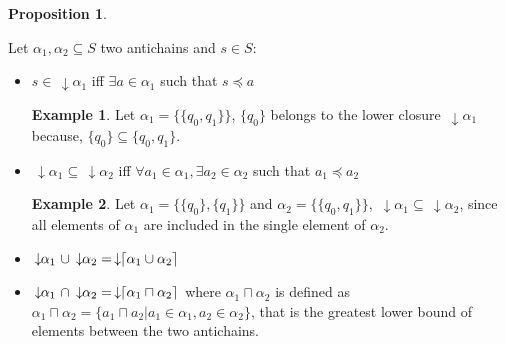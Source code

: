 \documentclass[11pt,a4paper]{article}
\DeclarePairedDelimiter{\ceil}{\lceil}{\rceil}
\newcommand{\darrow}{\, \downarrow \!\!}
\theoremstyle{definition}
\newtheorem{proposition}{Proposition}[subsection]
\newtheorem{example}{Example}[subsection]
\begin{document}
\begin{proposition}

\label{antichains_ops}

Let $\alpha_1, \alpha_2 \subseteq S$ two antichains and $s \in S$:

\begin{itemize}
    \item $s \in \darrow \alpha_1$
    iff $\exists a \in \alpha_1$ such that $s \preceq a$

    \begin{example}
        Let $\alpha_1 = \{\{q_0, q_1\}\}$, $\{q_0\}$ belongs to
        the lower closure $\darrow{\alpha_1}$ because,
        $\{q_0\} \subseteq \{q_0, q_1\}$.
    \end{example}

    \item $\darrow \alpha_1 \subseteq \darrow \alpha_2$
    iff $\forall a_1 \in \alpha_1,
    \exists a_2 \in \alpha_2$ such that $a_1 \preceq a_2$
    \begin{example}
    Let $\alpha_1 = \{\{q_0\}, \{q_1\}\}$ and
    $\alpha_2 = \{\{q_0, q_1\}\}$,
    $\darrow{\alpha_1} \subseteq \darrow{\alpha_2}$, since
    all elements of $\alpha_1$ are included
    in the single element of $\alpha_2$.
    \end{example}
    \item $ \darrow \alpha_1 \ \cup \darrow \alpha_2 =
    \darrow \ceil{\alpha_1 \cup \alpha_2}$

    \item $\darrow \alpha_1 \ \cap \darrow \alpha_2 =
    \darrow \ceil{\alpha_1 \sqcap \alpha_2}$ where $\alpha_1 \sqcap \alpha_2$
    is defined as
    $\alpha_1 \sqcap \alpha_2 = \{a_1 \sqcap a_2 | a_1
    \in \alpha_1, a_2 \in \alpha_2\}$, that is the greatest lower bound
    of elements between the two antichains.

\end{itemize}

\end{proposition}



%
%
\end{document}

